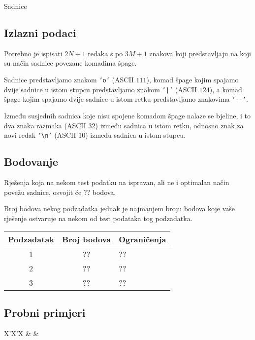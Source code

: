 \begin{statement}[
  problempoints=100,
  timelimit=1 sekunda,
  memorylimit=512 MiB,
]{Sadnice}
\subsection*{Izlazni podaci}
Potrebno je ispisati $2N+1$ redaka s po $3M+1$ znakova koji predstavljaju
na koji su način sadnice povezane komadima špage.

Sadnice predstavljamo znakom \texttt{'o'} (ASCII $111$), komad špage kojim
spajamo dvije sadnice u istom stupcu predstavljamo znakom \texttt{'|'} (ASCII
$124$), a komad špage kojim spajamo dvije sadnice u istom retku predstavljamo
znakovima \texttt{'-{}-'}.

Između susjednih sadnica koje nisu spojene komadom
špage nalaze se bjeline, i to dva znaka razmaka (ASCII $32$) između sadnica u
istom retku, odnosno znak za novi redak \texttt{'\textbackslash{}n'} (ASCII $10$)
između sadnica u istom stupcu.

\subsection*{Bodovanje}
Rješenja koja na nekom test podatku na ispravan, ali ne i optimalan način povežu
sadnice, osvojit će ?? bodova.

Broj bodova nekog podzadatka jednak je najmanjem broju bodova koje vaše rješenje
ostvaruje na nekom od test podataka tog podzadatka.

{\renewcommand{\arraystretch}{1.4}
  \setlength{\tabcolsep}{6pt}
  \begin{tabular}{ccl}
 Podzadatak & Broj bodova & Ograničenja \\ \midrule
  1 & ?? & ?? \\
  2 & ?? & ?? \\
  3 & ?? & ?? \\
\end{tabular}}

\subsection*{Probni primjeri}
\begin{tabularx}{\textwidth}{X'X'X}
 &
 &
\end{tabularx}


\end{statement}

